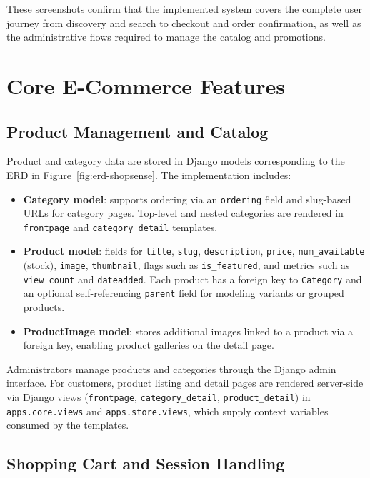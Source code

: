 These screenshots confirm that the implemented system covers the complete user journey from discovery and search to checkout and order confirmation, as well as the administrative flows required to manage the catalog and promotions.


\section{Core E-Commerce Features}

\subsection{Product Management and Catalog}

Product and category data are stored in Django models corresponding to the ERD in Figure~\ref{fig:erd-shopsense}. The implementation includes:

\begin{itemize}
  \item \textbf{Category model}: supports ordering via an \texttt{ordering} field and slug-based URLs for category pages. Top-level and nested categories are rendered in \texttt{frontpage} and \texttt{category\_detail} templates.
  \item \textbf{Product model}: fields for \texttt{title}, \texttt{slug}, \texttt{description}, \texttt{price}, \texttt{num\_available} (stock), \texttt{image}, \texttt{thumbnail}, flags such as \texttt{is\_featured}, and metrics such as \texttt{view\_count} and \texttt{dateadded}. Each product has a foreign key to \texttt{Category} and an optional self-referencing \texttt{parent} field for modeling variants or grouped products.
  \item \textbf{ProductImage model}: stores additional images linked to a product via a foreign key, enabling product galleries on the detail page.
\end{itemize}

Administrators manage products and categories through the Django admin interface. For customers, product listing and detail pages are rendered server-side via Django views (\texttt{frontpage}, \texttt{category\_detail}, \texttt{product\_detail}) in \texttt{apps.core.views} and \texttt{apps.store.views}, which supply context variables consumed by the templates.

\subsection{Shopping Cart and Session Handling}

